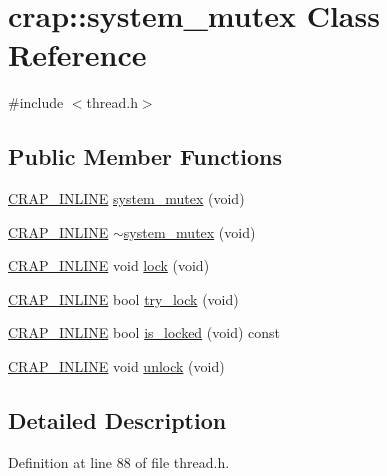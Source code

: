 \hypertarget{classcrap_1_1system__mutex}{}\section{crap\+:\+:system\+\_\+mutex Class Reference}
\label{classcrap_1_1system__mutex}


{\ttfamily \#include $<$thread.\+h$>$}

\subsection*{Public Member Functions}
\begin{DoxyCompactItemize}
\item 
\hyperlink{config__x86_8h_a5a40526b8d842e7ff731509998bb0f1c}{C\+R\+A\+P\+\_\+\+I\+N\+L\+I\+N\+E} \hyperlink{classcrap_1_1system__mutex_a96bef354b4c766f2caa7128f60be49b5}{system\+\_\+mutex} (void)
\item 
\hyperlink{config__x86_8h_a5a40526b8d842e7ff731509998bb0f1c}{C\+R\+A\+P\+\_\+\+I\+N\+L\+I\+N\+E} \hyperlink{classcrap_1_1system__mutex_a997735dd47c3ec23045eaad4433598bb}{$\sim$system\+\_\+mutex} (void)
\item 
\hyperlink{config__x86_8h_a5a40526b8d842e7ff731509998bb0f1c}{C\+R\+A\+P\+\_\+\+I\+N\+L\+I\+N\+E} void \hyperlink{classcrap_1_1system__mutex_a9f1d7b173a9b232b8596b4be7ba3626c}{lock} (void)
\item 
\hyperlink{config__x86_8h_a5a40526b8d842e7ff731509998bb0f1c}{C\+R\+A\+P\+\_\+\+I\+N\+L\+I\+N\+E} bool \hyperlink{classcrap_1_1system__mutex_a593fac45648b23875db49bb00e7c4f8f}{try\+\_\+lock} (void)
\item 
\hyperlink{config__x86_8h_a5a40526b8d842e7ff731509998bb0f1c}{C\+R\+A\+P\+\_\+\+I\+N\+L\+I\+N\+E} bool \hyperlink{classcrap_1_1system__mutex_abe6dbd61297cd4e23be26d26d9febd00}{is\+\_\+locked} (void) const 
\item 
\hyperlink{config__x86_8h_a5a40526b8d842e7ff731509998bb0f1c}{C\+R\+A\+P\+\_\+\+I\+N\+L\+I\+N\+E} void \hyperlink{classcrap_1_1system__mutex_a47051096449f83f99980d2d2da16fc9d}{unlock} (void)
\end{DoxyCompactItemize}


\subsection{Detailed Description}


Definition at line 88 of file thread.\+h.



